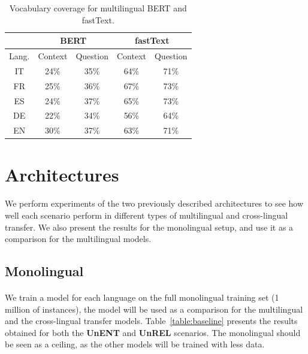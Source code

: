 \begin{table}[h!]
  \centering
  \begin{adjustbox}{width=0.6\columnwidth}
    \begin{tabular}{c|cc|cc}
    \toprule
          & \multicolumn{2}{c|}{BERT} & \multicolumn{2}{c}{fastText} \\
    \midrule
    \multicolumn{1}{l|}{Lang.} & Context & Question & Context & Question \\
    \midrule
    IT    & 24\%  & 35\%  & 64\%  & 71\%  \\
    FR    & 25\%  & 36\%  & 67\%  & 73\%  \\
    ES    & 24\%  & 37\%  & 65\%  & 73\%  \\
    DE    & 22\%  & 34\%  & 56\%  & 64\%  \\
    EN    & 30\%  & 37\%  & 63\%  & 71\%  \\
    \bottomrule
    \end{tabular}%
  \end{adjustbox}
  \caption{Vocabulary coverage for multilingual BERT and fastText.}
  \label{tab:lang_model_coverage}%

\end{table}%



\section{Architectures}
\paragraph{}
We perform experiments of the two previously described architectures to see how well each scenario perform in different types of multilingual and cross-lingual transfer. We also present the results for the monolingual setup, and use it as a comparison for the multilingual models. 

\newpage
\subsection{Monolingual}
\paragraph{}
We train a model for each language on the full monolingual training set (1 million of instances), the model will be used as a comparison for the multilingual and the cross-lingual transfer models. Table~\ref{table:baseline} presents the results obtained for both the \textbf{UnENT} and \textbf{UnREL} scenarios. The monolingual should be seen as a ceiling, as the other models will be trained with less data.

